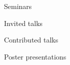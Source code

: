 \begin{itemize}[noitemsep]
{
\item{\sc Seminars}
    
\item{\sc Invited talks}
    
\item{\sc Contributed talks}
    
\item{\sc Poster presentations}
    
}\end{itemize}
